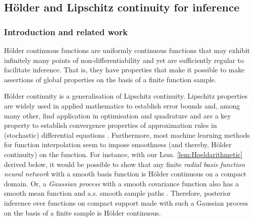 \subsection{H\"older and Lipschitz continuity for inference}%
\label{sec:Hoelder_brief}
\subsubsection{Introduction and related work}



H\"older continuous functions are uniformly continuous functions that may exhibit infinitely many points of non-differentiability and yet are sufficiently regular to facilitate inference. That is, they have properties that make it possible to make assertions of global properties on the basis of a finite function sample. 

H\"older continuity is a generalisation of Lipschitz continuity.  Lipschitz properties are widely used in applied mathematics to establish error bounds and, among many other, find application in optimisation \cite{Shubert:72,direct:93} and quadrature \cite{Baran2008,curbera1998,dereich2006} and are a key property to establish convergence properties of approximation rules in (stochastic) differential equations \cite{kloedenandplaten1992,Gardiner2009}. 
Furthermore, most machine learning methods for function interpolation seem to impose smoothness (and thereby, H\"older continuity) on the function. For instance, with our Lem. \ref{lem:Hoeldarithmetic} derived below, it would be possible to show that any finite \textit{radial basis function neural network} \cite{Broomhead1988} with a smooth basis function is H\"older continuous on a compact domain. Or, a \textit{Gaussian process} with a smooth covariance function also has a smooth mean function and a.s. smooth sample paths  \cite{GPbook:2006,grimmetbook2001}. Therefore, posterior inference over functions on compact support made with such a Gaussian process on the basis of a finite sample is H\"older continuous. 


